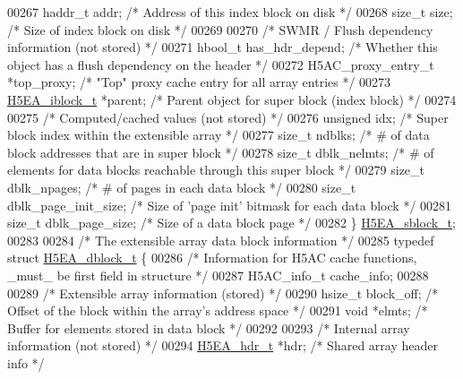 \begin{DoxyCode}
00267     haddr\_t     addr;           \textcolor{comment}{/* Address of this index block on disk          */}
00268     \textcolor{keywordtype}{size\_t}      size;           \textcolor{comment}{/* Size of index block on disk                  */}
00269 
00270     \textcolor{comment}{/* SWMR / Flush dependency information (not stored) */}
00271     hbool\_t     has\_hdr\_depend; \textcolor{comment}{/* Whether this object has a flush dependency on the header */}
00272     H5AC\_proxy\_entry\_t *top\_proxy;      \textcolor{comment}{/* "Top" proxy cache entry for all array entries */}
00273     \hyperlink{struct_h5_e_a__iblock__t}{H5EA\_iblock\_t} *parent;      \textcolor{comment}{/* Parent object for super block (index block)  */}
00274 
00275     \textcolor{comment}{/* Computed/cached values (not stored) */}
00276     \textcolor{keywordtype}{unsigned}    idx;            \textcolor{comment}{/* Super block index within the extensible array */}
00277     \textcolor{keywordtype}{size\_t}      ndblks;         \textcolor{comment}{/* # of data block addresses that are in super block */}
00278     \textcolor{keywordtype}{size\_t}      dblk\_nelmts;    \textcolor{comment}{/* # of elements for data blocks reachable through this super block */}
00279     \textcolor{keywordtype}{size\_t}      dblk\_npages;    \textcolor{comment}{/* # of pages in each data block */}
00280     \textcolor{keywordtype}{size\_t}      dblk\_page\_init\_size;    \textcolor{comment}{/* Size of 'page init' bitmask for each data block */}
00281     \textcolor{keywordtype}{size\_t}      dblk\_page\_size; \textcolor{comment}{/* Size of a data block page */}
00282 \} \hyperlink{struct_h5_e_a__sblock__t}{H5EA\_sblock\_t};
00283 
00284 \textcolor{comment}{/* The extensible array data block information */}
00285 \textcolor{keyword}{typedef} \textcolor{keyword}{struct }\hyperlink{struct_h5_e_a__dblock__t}{H5EA\_dblock\_t} \{
00286     \textcolor{comment}{/* Information for H5AC cache functions, \_must\_ be first field in structure */}
00287     H5AC\_info\_t cache\_info;
00288 
00289     \textcolor{comment}{/* Extensible array information (stored) */}
00290     hsize\_t     block\_off;      \textcolor{comment}{/* Offset of the block within the array's address space */}
00291     \textcolor{keywordtype}{void}        *elmts;         \textcolor{comment}{/* Buffer for elements stored in data block  */}
00292 
00293     \textcolor{comment}{/* Internal array information (not stored) */}
00294     \hyperlink{struct_h5_e_a__hdr__t}{H5EA\_hdr\_t}  *hdr;           \textcolor{comment}{/* Shared array header info                             */}

\end{DoxyCode}

